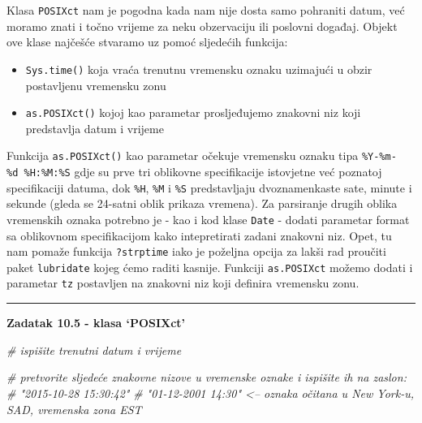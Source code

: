 \documentclass[]{book}
\newenvironment{Shaded}{\begin{snugshade}}{\end{snugshade}}
\newcommand{\KeywordTok}[1]{\textcolor[rgb]{0.13,0.29,0.53}{\textbf{#1}}}
\newcommand{\DataTypeTok}[1]{\textcolor[rgb]{0.13,0.29,0.53}{#1}}
\newcommand{\StringTok}[1]{\textcolor[rgb]{0.31,0.60,0.02}{#1}}
\newcommand{\CommentTok}[1]{\textcolor[rgb]{0.56,0.35,0.01}{\textit{#1}}}
\newcommand{\NormalTok}[1]{#1}
\providecommand{\tightlist}{%
  \setlength{\itemsep}{0pt}\setlength{\parskip}{0pt}}
\theoremstyle{definition}
\theoremstyle{definition}
\theoremstyle{definition}
\theoremstyle{remark}
\begin{document}
Klasa \texttt{POSIXct} nam je pogodna kada nam nije dosta samo pohraniti
datum, već moramo znati i točno vrijeme za neku obzervaciju ili poslovni
događaj. Objekt ove klase najčešće stvaramo uz pomoć sljedećih funkcija:

\begin{itemize}
\tightlist
\item
  \texttt{Sys.time()} koja vraća trenutnu vremensku oznaku uzimajući u
  obzir postavljenu vremensku zonu
\item
  \texttt{as.POSIXct()} kojoj kao parametar prosljeđujemo znakovni niz
  koji predstavlja datum i vrijeme
\end{itemize}

Funkcija \texttt{as.POSIXct()} kao parametar očekuje vremensku oznaku
tipa \texttt{\%Y-\%m-\%d\ \%H:\%M:\%S} gdje su prve tri oblikovne
specifikacije istovjetne već poznatoj specifikaciji datuma, dok
\texttt{\%H}, \texttt{\%M} i \texttt{\%S} predstavljaju dvoznamenkaste
sate, minute i sekunde (gleda se 24-satni oblik prikaza vremena). Za
parsiranje drugih oblika vremenskih oznaka potrebno je - kao i kod klase
\texttt{Date} - dodati parametar format sa oblikovnom specifikacijom
kako intepretirati zadani znakovni niz. Opet, tu nam pomaže funkcija
\texttt{?strptime} iako je poželjna opcija za lakši rad proučiti paket
\texttt{lubridate} kojeg ćemo raditi kasnije. Funkciji
\texttt{as.POSIXct} možemo dodati i parametar \texttt{tz} postavljen na
znakovni niz koji definira vremensku zonu.

\begin{center}\rule{0.5\linewidth}{\linethickness}\end{center}

\textbf{Zadatak 10.5 - klasa `POSIXct'}

\begin{Shaded}
\begin{Highlighting}[]
\CommentTok{# ispišite trenutni datum i  vrijeme}

\CommentTok{# pretvorite sljedeće znakovne nizove u vremenske oznake i ispišite ih na zaslon:}
\CommentTok{# "2015-10-28 15:30:42"}
\CommentTok{# "01-12-2001 14:30"   <-- oznaka očitana u New York-u, SAD, vremenska zona EST}
\end{Highlighting}
\end{Shaded}

\begin{Shaded}
\end{Shaded}
\end{document}
